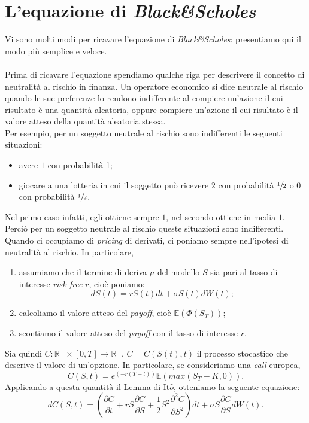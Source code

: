 \documentclass[a4paper,10pt]{report}
\newcommand{\der}[2]{\frac{\partial #1}{\partial #2}}
\newcommand{\dder}[2]{\frac{\partial^2 #1}{\partial #2^2}}
\theoremstyle{osservazione}
\theoremstyle{esempio}
\theoremstyle{notazione}
\theoremstyle{corollario}
\begin{document}
\section{L'equazione di \emph{Black\&Scholes}}
Vi sono molti modi per ricavare l'equazione di \emph{Black\&Scholes}: presentiamo qui il modo pi\`u semplice e veloce.\\\\Prima di ricavare l'equazione spendiamo qualche riga per descrivere il concetto di neutralit\`a al rischio in finanza. Un operatore economico si dice neutrale al rischio quando le sue preferenze lo rendono indifferente al compiere un'azione il cui risultato \`e una quantit\`a aleatoria, oppure compiere un'azione il cui risultato \`e il valore atteso della quantit\`a aleatoria stessa.\\Per esempio, per un soggetto neutrale al rischio sono indifferenti le seguenti situazioni:
\begin{itemize}
\item avere $1$\officialeuro$ $ con probabilit\`a 1;
\item giocare a una lotteria in cui il soggetto pu\`o ricevere $2$\officialeuro$ $ con probabilit\`a $\sfrac{1}{2}$ o $0$\officialeuro$ $ con probabilit\`a $\sfrac{1}{2}$.
\end{itemize}
Nel primo caso infatti, egli ottiene sempre $1$\officialeuro$ $, nel secondo ottiene in media $1$\officialeuro$ $. Perci\`o per un soggetto neutrale al rischio queste situazioni sono indifferenti.\\Quando ci occupiamo di \emph{pricing} di derivati, ci poniamo sempre nell'ipotesi di neutralit\`a al rischio. In particolare,
\begin{enumerate}
\item assumiamo che il termine di deriva $\mu$ del modello $S$ sia pari al tasso di interesse \emph{risk-free} $r$, cio\`e poniamo: $$dS(t)=rS(t)dt+\sigma S(t)dW(t);$$
\item calcoliamo il valore atteso del \emph{payoff}, cio\`e $\mathbb{E}(\Phi(S_T))$;
\item scontiamo il valore atteso del \emph{payoff} con il tasso di interesse $r$.
\end{enumerate}
Sia quindi $C:\mathbb{R}^+\times[0,T]\rightarrow\mathbb{R}^+$, $C=C(S(t),t)$ il processo stocastico che descrive il valore di un'opzione. In particolare, se consideriamo una \emph{call} europea,
$$C(S,t)=e^{(-r(T-t))}\mathbb{E}\left(max(S_T-K,0)\right).$$
Applicando a questa quantit\`a il Lemma di It$\hat{o}$, otteniamo la seguente equazione: $$dC(S,t)=\left(\der{C}{t}+r S \der{C}{S} +\frac{1}{2}S^2\dder{C}{S}\right)dt+\sigma S \der{C}{S}dW(t).$$
\end{document}
